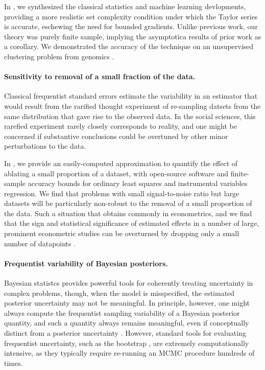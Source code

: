 In \citet{giordano:2019:ij}, we synthesized the classical statistics and machine
learning devlopments, providing a more realistic set complexity condition under
which the Taylor series is accurate, eschewing the need for bounded gradients.
Unlike previous work, our theory was purely finite sample, implying the
asymptotica results of prior work as a corollary.  We demonstrated the accuracy
of the technique on an unsupervised clustering problem from genomics
\citep{shoemaker:2015:ultrasensitive}.


\paragraph{Sensitivity to removal of a small fraction of the data.} Classical
frequentist standard errors estimate the variability in an estimator that would
result from the rarified thought experiment of re-sampling datsets from the same
distribution that gave rise to the observed data.  In the social sciences, this
rarefied experiment rarely closely corresponds to reality, and one might be
concerned if substantive conclusions could be overtuned by other minor
perturbations to the data.

In \citet{giordano:2020:amip}, we provide an easily-computed approximation to
quantify the effect of ablating a small proportion of a dataset, with
open-source software and finite-sample accuracy bounds for ordinary least
squares and instrumental variables regression. We find that problems with small
signal-to-noise ratio but large datasets will be particularly non-robust to the
removal of a small proportion of the data. Such a situation that obtains
commonly in econometrics, and we find that the sign and statistical significance
of estimated effects in a number of large, prominent econometric studies can be
overturned by dropping only a small number of datapoints
\citep{angelucci:2009:indirect, finkelstein:2012:oregon, meager:2019:microcredit}.


\paragraph{Frequentist variability of Bayesian posteriors.}

Bayesian statistcs provides powerful tools for coherently treating uncertainty
in complex problems, though, when the model is misspecified, the estimated
posterior uncertainty may not be meaningful.  In principle, however, one might
always compute the frequentist sampling variability of a Bayesian posterior
quantity, and such a quantity always remains meaningful, even if conceptually
distinct from a posterior uncertainty \citep{waddell:2002:bayesphyloboot,
kleijn:2006:misspecification}.  However, standard tools for evaluating
frequentist uncertainty, such as the bootstrap \citep{huggins:2019:bayesbag},
are extremely computationally intensive, as they typically require re-running an
MCMC procedure hundreds of times.

